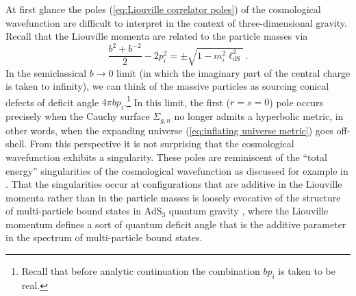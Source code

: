 \documentclass[12pt,a4paper]{article}
\begin{document}
At first glance the poles (\ref{eq:Liouville correlator poles}) of the cosmological wavefunction are difficult to interpret in the context of three-dimensional gravity. Recall that the Liouville momenta are related to the particle masses via
\begin{equation}
    \frac{b^2+b^{-2}}{2}-2p_i^2 = \pm \sqrt{1-m_i^2\ell_{\text{dS}}^2}\, .
\end{equation}
In the semiclassical $b\to 0$ limit (in which the imaginary part of the central charge is taken to infinity), we can think of the massive particles as sourcing conical defects of deficit angle $4\pi b p_i$.\footnote{Recall that before analytic continuation the combination $bp_i$ is taken to be real.} In this limit, the first ($r=s=0$) pole occurs precisely when the Cauchy surface $\Sigma_{g,n}$ no longer admits a hyperbolic metric, in other words, when the expanding universe (\ref{eq:inflating universe metric}) goes off-shell. From this perspective it is not surprising that the cosmological wavefunction exhibits a singularity. These poles are reminiscent of the ``total energy'' singularities of the cosmological wavefunction as discussed for example in \cite{Baumann:2021fxj}. That the singularities occur at configurations that are additive in the Liouville momenta rather than in the particle masses is loosely evocative of the structure of multi-particle bound states in AdS$_3$ quantum gravity \cite{Collier:2018exn}, where the Liouville momentum defines a sort of quantum deficit angle that is the additive parameter in the spectrum of multi-particle bound states.
\end{document}
